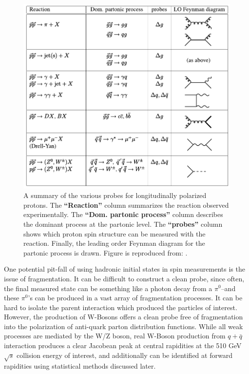 \begin{figure}[ht]
  \centering
  \includegraphics[width=\linewidth]{./figures/spin_probes.pdf}
  \caption{
    A summary of the various probes for longitudinally polarized protons. The
    \textbf{``Reaction''} column summarizes the reaction observed experimentally.
    The \textbf{``Dom. partonic process''} column describes the dominant process
    at the partonic level. The \textbf{``probes''} column shows which proton spin
    structure can be measured with the reaction. Finally, the leading order
    Feynman diagram for the partonic process is drawn. Figure is reproduced
    from: \cite{Aidala2005}.
  }
  \label{fig:spin_probes_masterspin}

\end{figure}

One potential pit-fall of using hadronic initial states in spin measurements is
the issue of fragmentation. It can be difficult to construct a clean probe,
since often, the final measured state can be something like a photon decay from
a $\pi^0$--and these $\pi^0$'s can be produced in a vast array of fragmentation
processes. It can be hard to isolate the parent interaction which produced the
particles of interest. However, the production of W-Bosons offers a clean probe
free of fragmentation into the polarization of anti-quark parton distribution
functions. While all weak processes are mediated by the W/Z boson, real W-Boson
production from $q+\bar{q}$ interaction produces a clear Jacobean peak at
central rapidities at the 510 GeV $\sqrt{s}$ collision energy of interest, and
additionally can be identified at forward rapidities using statistical methods
discussed later.

